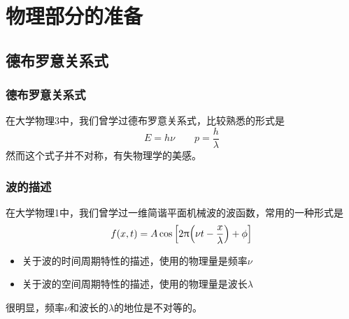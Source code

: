 \section{物理部分的准备}

\subsection{德布罗意关系式}

\begin{frame}
    \frametitle{德布罗意关系式}
    在大学物理3中，我们曾学过德布罗意关系式，比较熟悉的形式是
    \begin{equation}
        E=h\nu\qquad
        p=\frac{h}{\lambda}\label{德布罗意关系式原始1}
    \end{equation}
    然而这个式子并不对称，有失物理学的美感。
\end{frame}

\begin{frame}
    \frametitle{波的描述}
    在大学物理1中，我们曾学过一维简谐平面机械波的波函数，常用的一种形式是
    \begin{equation}
        f(x,t)=A\cos\qty[2\uppi\qty(\nu t-\frac{x}{\lambda})+\phi]\label{一维机械波}
    \end{equation}
    \begin{itemize}
        \item 关于波的时间周期特性的描述，使用的物理量是频率$\nu$\vspace{1ex}
        \item 关于波的空间周期特性的描述，使用的物理量是波长$\lambda$\vspace{1ex}
    \end{itemize}
    很明显，频率$\nu$和波长的$\lambda$的地位是不对等的。
\end{frame}

